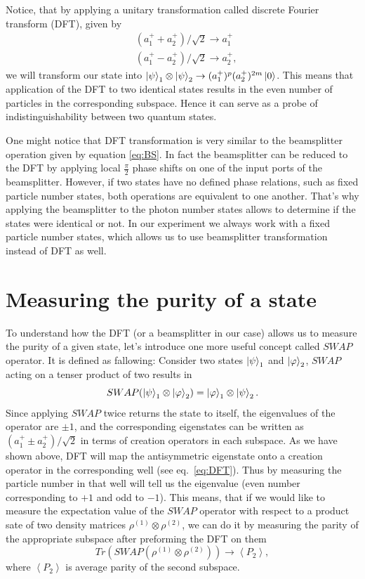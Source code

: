 Notice, that by applying a unitary transformation called discrete Fourier transform (DFT), given by
\begin{equation}
\begin{aligned}
& (a_{1}^+ + a_{2}^+ )/\sqrt{2} \rightarrow a_{1}^+ \\
& (a_{1}^+ - a_{2}^+ )/\sqrt{2} \rightarrow a_{2}^+,
\end{aligned}
\label{eq:DFT}
\end{equation}
we will transform our state into $\left|\psi\right\rangle_1 \otimes \left|\psi\right\rangle_2 \rightarrow (a^+_1)^p (a^+_2)^{2m}\left|0\right\rangle$. This means that application of the DFT to two identical states results in the even number of particles in the corresponding subspace. Hence it can serve as a probe of indistinguishability between two quantum states.

One might notice that DFT transformation is very similar to the beamsplitter operation given by equation \ref{eq:BS}. In fact the beamsplitter can be reduced to the DFT by applying local $\frac{\pi}{2}$ phase shifts on one of the input ports of the beamsplitter. However, if two states have no defined phase relations, such as fixed particle number states, both operations are equivalent to one another. That's why applying the beamsplitter to the photon number states allows to determine if the states were identical or not. In our experiment we always work with a fixed particle number states, which allows us to use beamsplitter transformation instead of DFT as well. 

\section{Measuring the purity of a state}
To understand how the DFT (or a beamsplitter in our case) allows us to measure the purity of a given state, let's introduce one more useful concept called $SWAP$ operator. It is defined as fallowing: Consider two states $\left|\psi\right\rangle_1$ and $\left|\varphi\right\rangle_2$, $SWAP$ acting on a tenser product of two results in 
\begin{equation}
SWAP(\left|\psi\right\rangle_1 \otimes \left|\varphi\right\rangle_2) = \left|\varphi\right\rangle_1 \otimes \left|\psi\right\rangle_2.
\end{equation}
Since applying $SWAP$ twice returns the state to itself, the eigenvalues of the operator are $\pm 1$, and the corresponding eigenstates can be written as $(a^+_1 \pm a^+_2)/\sqrt{2}$ in terms of creation operators in each subspace. As we have shown above, DFT will map the antisymmetric eigenstate onto a creation operator in the corresponding well (see eq.~\ref{eq:DFT}). Thus by measuring the particle number in that well will tell us the eigenvalue (even number corresponding to $+1$ and odd to $-1$). This means, that if we would like to measure the expectation value of the $SWAP$ operator with respect to a product sate of two density matrices $\rho^{(1)} \otimes \rho^{(2)}$, we can do it by measuring the parity of the appropriate subspace after preforming the DFT on them
\begin{equation}
Tr(SWAP(\rho^{(1)} \otimes \rho^{(2)})) \rightarrow \left< P_2 \right>,
\end{equation}
where $\left< P_2 \right>$ is average parity of the second subspace. 